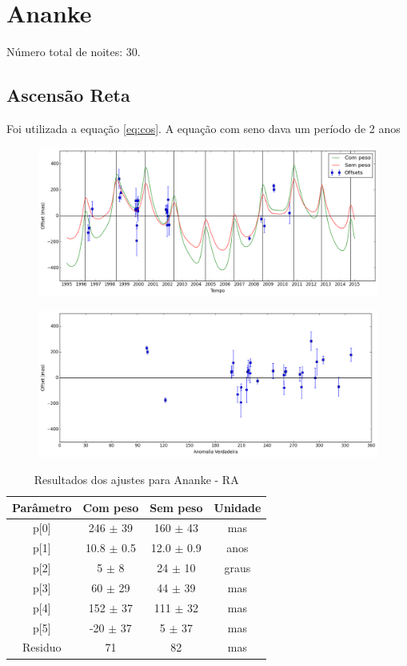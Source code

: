 \documentclass[11pt,a4paper]{report}
\begin{document}
\chapter*{Ananke}

\indent \indent Número total de noites: 30.

\section*{Ascensão Reta}

Foi utilizada a equação \ref{eq:cos}. A equação com seno dava um período de 2 anos

\begin{figure}[h]
\includegraphics[scale=0.45]{Ananke/RA.png} 
\end{figure}

\begin{figure}[h]
\includegraphics[scale=0.45]{Ananke/RA_anom.png}  
\end{figure}

\begin{table}[h!]
\caption{\label{Tab: Ananke-RA} Resultados dos ajustes para Ananke - RA}
\begin{centering}
\begin{tabular}{cccc}
\hline
\hline
Parâmetro & Com peso & Sem peso & Unidade\tabularnewline
\hline
p[0] & 246 $\pm$ 39 & 160 $\pm$ 43 & mas\\
p[1] & 10.8 $\pm$ 0.5 & 12.0 $\pm$ 0.9 & anos\\
p[2] & 5 $\pm$ 8 & 24 $\pm$ 10 & graus\\
p[3] & 60 $\pm$ 29 & 44 $\pm$ 39 & mas\\
p[4] & 152 $\pm$ 37 & 111 $\pm$ 32 & mas\\
p[5] & -20 $\pm$ 37 & 5 $\pm$ 37 & mas\\
Residuo & 71 & 82 & mas\\
\hline 
\end{tabular} 
\par\end{centering}
\end{table}
\end{document}
